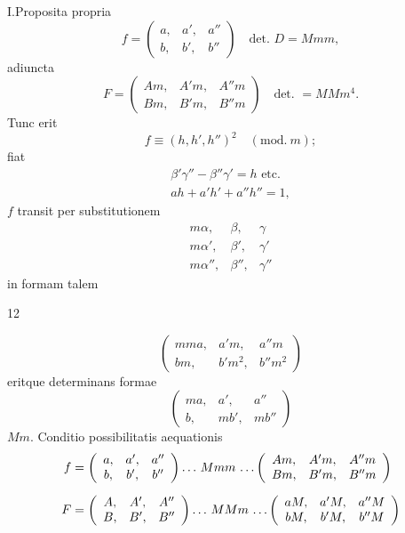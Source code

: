 \noindent\hspace*{\parindent}I.\quad Proposita propria
\[
f=\left(\begin{array}{ccc}a,&a',&a''\\b,&b',&b''\end{array}\right)
\quad\text{det. }D=Mmm,
\]
\noindent adiuncta
\[
F=\left(\begin{array}{ccc}Am,&A'm,&A''m\\Bm,&B'm,&B''m\end{array}\right)
\quad\text{det. }=MMm^4.
\]
\noindent Tunc erit
\[
f\equiv(h,h',h'')^2\quad(\mathrm{mod.}\ m);
\]
\noindent fiat
\[
\begin{gathered}
\beta'\gamma''-\beta''\gamma'=h\text{ etc.}\\
ah+a'h'+a''h''=1,
\end{gathered}
\]
\noindent $f$ transit per substitutionem
\[
\begin{array}{ccc}m\alpha,&\beta,&\gamma\\m\alpha',&\beta',&\gamma'\\m\alpha'',&\beta'',&\gamma''\end{array}
\]
\noindent in formam talem
\par\smallskip{}\hfill{\small 12}\par
\clearpage
{}
\[
\left(\begin{array}{ccc}mma,&a'm,&a''m\\bm,&b'm^2,&b''m^2\end{array}\right)
\]
\noindent eritque determinans formae
\[
\left(\begin{array}{ccc}ma,&a',&a''\\b,&mb',&mb''\end{array}\right)
\]
\noindent $Mm$. Conditio possibilitatis aequationis
\[
\begin{aligned}
f&=\left(\begin{array}{ccc}a,&a',&a''\\b,&b',&b''\end{array}\right)
\mathinner{.\,.\,.}\,Mmm\,\mathinner{.\,.\,.}
\left(\begin{array}{ccc}Am,&A'm,&A''m\\Bm,&B'm,&B''m\end{array}\right)\\[6pt]
F&=\left(\begin{array}{ccc}A,&A',&A''\\B,&B',&B''\end{array}\right)
\mathinner{.\,.\,.}\,MMm\,\mathinner{.\,.\,.}
\left(\begin{array}{ccc}aM,&a'M,&a''M\\bM,&b'M,&b''M\end{array}\right)
\end{aligned}
\]
